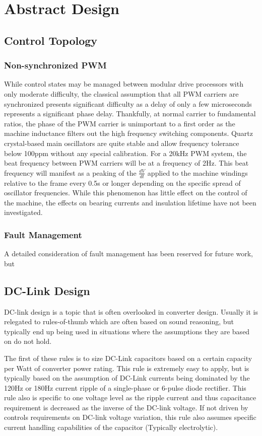 \chapter{Abstract Design}

\section{Control Topology}


\subsection{Non-synchronized PWM}
While control states may be managed between modular drive processors with only
moderate difficulty, the classical assumption that all PWM carriers are
synchronized presents significant difficulty as a delay of only a few
microseconds represents a significant phase delay.
Thankfully, at normal carrier to fundamental ratios, the phase of the PWM
carrier is unimportant to a first order as the machine inductance filters out
the high frequency switching components.
Quartz crystal-based main oscillators are quite stable and allow frequency
tolerance below 100ppm without any special calibration.
For a 20kHz PWM system, the beat frequency between PWM carriers will be at a
frequency of 2Hz.
This beat frequency will manifest as a peaking of the $\frac{dV}{dt}$ applied
to the machine windings relative to the frame every 0.5s or longer depending
on the specific spread of oscillator frequencies.
While this phenomenon has little effect on the control of the machine, the
effects on bearing currents and insulation lifetime have not been investigated.

\subsection{Fault Management}
A detailed consideration of fault management has been reserved for future work, but 

\section{DC-Link Design}
DC-link design is a topic that is often overlooked in converter design.
Usually it is relegated to rules-of-thumb which are often based on sound
reasoning, but typically end up being used in situations where the assumptions
they are based on do not hold.

The first of these rules is to size DC-Link capacitors based on a certain
capacity per Watt of converter power rating.
This rule is extremely easy to apply, but is typically based on the assumption
of DC-Link currents being dominated by the 120Hz or 180Hz current ripple of a
single-phase or 6-pulse diode rectifier.
This rule also is specific to one voltage level as the ripple current and thus
capacitance requirement is decreased as the inverse of the DC-link voltage.
If not driven by controls requirements on DC-link voltage variation, this rule
also assumes specific current handling capabilities of the capacitor
(Typically electrolytic).

